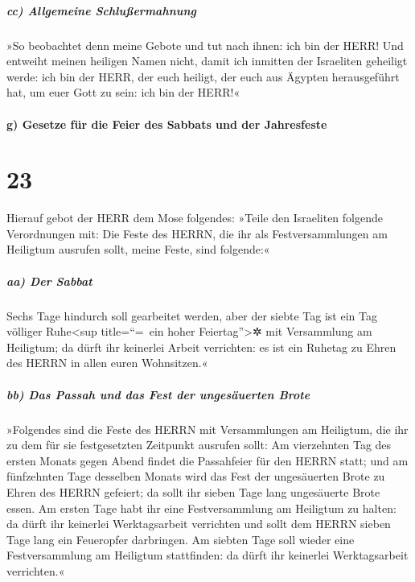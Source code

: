 \hypertarget{cc-allgemeine-schluuxdfermahnung}{%
\subparagraph{cc) Allgemeine
Schlußermahnung}\label{cc-allgemeine-schluuxdfermahnung}}

»So beobachtet denn meine Gebote und tut nach ihnen: ich
bin der HERR! Und entweiht meinen heiligen Namen nicht,
damit ich inmitten der Israeliten geheiligt werde: ich bin der HERR, der
euch heiligt, der euch aus Ägypten herausgeführt hat, um
euer Gott zu sein: ich bin der HERR!«

\hypertarget{g-gesetze-fuxfcr-die-feier-des-sabbats-und-der-jahresfeste}{%
\paragraph{g) Gesetze für die Feier des Sabbats und der
Jahresfeste}\label{g-gesetze-fuxfcr-die-feier-des-sabbats-und-der-jahresfeste}}

\hypertarget{section-22}{%
\section{23}\label{section-22}}

Hierauf gebot der HERR dem Mose folgendes:
»Teile den Israeliten folgende Verordnungen mit: Die Feste
des HERRN, die ihr als Festversammlungen am Heiligtum ausrufen sollt,
meine Feste, sind folgende:«

\hypertarget{aa-der-sabbat}{%
\subparagraph{aa) Der Sabbat}\label{aa-der-sabbat}}

Sechs Tage hindurch soll gearbeitet werden, aber der
siebte Tag ist ein Tag völliger Ruhe\textless sup title=``=~ein hoher
Feiertag''\textgreater✲ mit Versammlung am Heiligtum; da dürft ihr
keinerlei Arbeit verrichten: es ist ein Ruhetag zu Ehren des HERRN in
allen euren Wohnsitzen.«

\hypertarget{bb-das-passah-und-das-fest-der-ungesuxe4uerten-brote}{%
\subparagraph{bb) Das Passah und das Fest der ungesäuerten
Brote}\label{bb-das-passah-und-das-fest-der-ungesuxe4uerten-brote}}

»Folgendes sind die Feste des HERRN mit Versammlungen am
Heiligtum, die ihr zu dem für sie festgesetzten Zeitpunkt ausrufen
sollt: Am vierzehnten Tag des ersten Monats gegen Abend
findet die Passahfeier für den HERRN statt; und am
fünfzehnten Tage desselben Monats wird das Fest der ungesäuerten Brote
zu Ehren des HERRN gefeiert; da sollt ihr sieben Tage lang ungesäuerte
Brote essen. Am ersten Tage habt ihr eine Festversammlung
am Heiligtum zu halten: da dürft ihr keinerlei Werktagsarbeit verrichten
und sollt dem HERRN sieben Tage lang ein Feueropfer
darbringen. Am siebten Tage soll wieder eine Festversammlung am
Heiligtum stattfinden: da dürft ihr keinerlei Werktagsarbeit
verrichten.«

